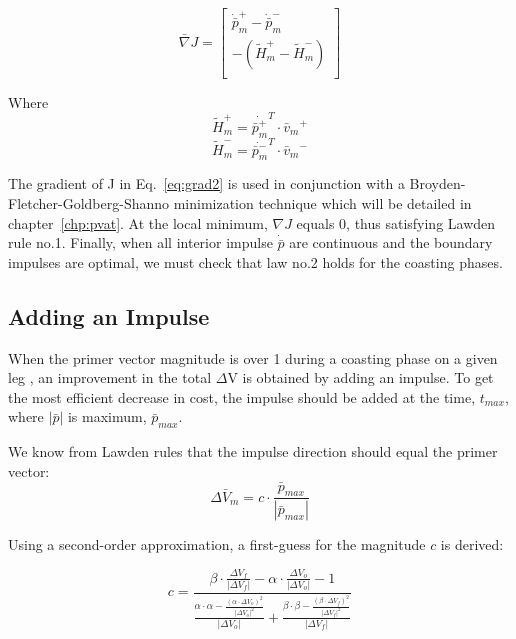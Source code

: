 \documentclass[12pt]{report}
\begin{document}
\begin{equation}
\bar \nabla J = \left[ \begin{array}{c}
 \dot{\bar p}_{m}^{+} - \dot{\bar p}_{m}^{-} \\
 -(\tilde{H}_{m}^{+} - \tilde{H}_{m}^{-}) \\
\end{array} \right]
\label{eq:grad2}
\end{equation}

\noindent Where
\begin{equation}
\tilde{H}_{m}^{+} = \dot{\bar p_{m}^{+}}^{T}\cdot{\bar v_{m}}^{+}
\end{equation}
\begin{equation}
\tilde{H}_{m}^{-} = \dot{\bar p_{m}^{-}}^{T}\cdot{\bar v_{m}}^{-}
\end{equation}

\noindent The gradient of J in Eq.~\ref{eq:grad2} is used in
conjunction with a Broyden-Fletcher-Goldberg-Shanno minimization
technique which will be detailed in chapter~\ref{chp:pvat}. At the
local minimum, $\nabla J$ equals 0, thus satisfying Lawden rule
no.1. Finally, when all interior impulse $\dot{\bar p}$ are
continuous and the boundary impulses are optimal, we must check
that law no.2 holds for the coasting phases.

\subsection{Adding an Impulse}
When the primer vector magnitude is over 1 during a coasting phase
on a given leg , an improvement in the total $\Delta$V is obtained
by adding an impulse. To get the most efficient decrease in cost,
the impulse should be added at the time, $t_{max}$, where $|\bar
p|$ is maximum, $\bar p_{max}$.

\noindent We know from Lawden rules that the impulse direction
should equal the primer vector:
\begin{equation}
\Delta \bar V_{m} = c \cdot \frac{\bar p_{max}}{|\bar
p_{max}|}\label{eq:dv}
\end{equation}

\noindent Using a second-order approximation, a first-guess for
the magnitude $c$ is derived:

\begin{equation}
c = \frac{\beta \cdot \frac{ \Delta V_{f}}{|\Delta V_{f}|} -
\alpha \cdot \frac{\Delta V_{o}}{|\Delta V_{o}|} - 1}{\frac{\alpha
\cdot \alpha - \frac{(\alpha \cdot \Delta V_{o})^{2}}{|\Delta
V_{o}|^{2}}}{|\Delta V_{o}|}+ \frac{\beta \cdot \beta -
\frac{(\beta \cdot \Delta V_{f})^{2}}{|\Delta V_{f}|^{2}}}{|\Delta
V_{f}|}}\label{eq:c}
\end{equation}
\end{document}
